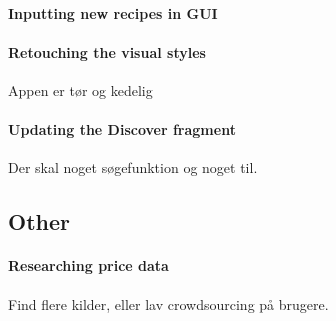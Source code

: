 \paragraph{Inputting new recipes in GUI}

\paragraph{Retouching the visual styles}
Appen er tør og kedelig

\paragraph{Updating the Discover fragment}
Der skal noget søgefunktion og noget til.

\subsection{Other}

\paragraph{Researching price data}
Find flere kilder, eller lav crowdsourcing på brugere.
